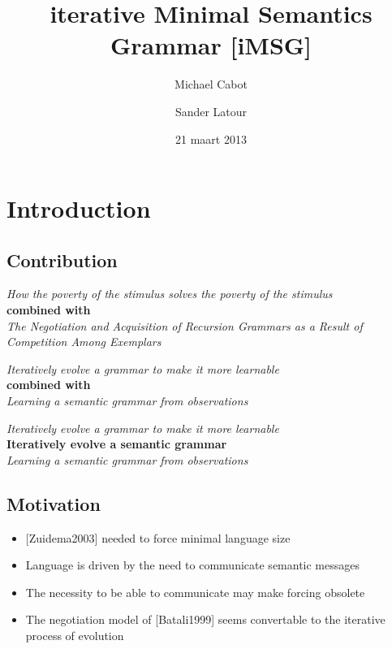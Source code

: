 \documentclass[11pt,a4paper,xcolor=dvipsnames]{beamer}
\author[Michael Cabot \and Sander Latour]{Michael Cabot \and Sander Latour}
\institute{University of Amsterdam}
\title[iMSG]{iterative Minimal Semantics Grammar [iMSG]}
\date{21 maart 2013}
\begin{document}
\begin{frame}
\titlepage
\end{frame}

\begin{frame}
\tableofcontents
\end{frame}

\section{Introduction}
\subsection{Contribution}
\begin{frame}
  \begin{center}
    \textit{How the poverty of the stimulus solves the poverty of the stimulus}\\
    \vfill
    \textbf{combined with}\\
    \vfill
    \textit{The Negotiation and Acquisition of Recursion Grammars as a Result of Competition Among Exemplars}
  \end{center}
\end{frame}

\begin{frame}
  \begin{center}
    \textit{Iteratively evolve a grammar to make it more learnable}\\
    \vfill
    \textbf{combined with}\\
    \vfill
    \textit{Learning a semantic grammar from observations}
  \end{center}
\end{frame}

\begin{frame}
  \begin{center}
    \textit{Iteratively evolve a grammar to make it more learnable}\\
    \vfill
    \textbf{Iteratively evolve a semantic grammar}\\
    \vfill
    \textit{Learning a semantic grammar from observations}
  \end{center}
\end{frame}

\subsection{Motivation}
\begin{frame}
  \begin{itemize}
    \item \hspace*{0pt}[Zuidema2003] needed to force minimal language size
    \item Language is driven by the need to communicate semantic messages
    \item The necessity to be able to communicate may make forcing obsolete
    \item The negotiation model of [Batali1999] seems convertable to the iterative process of evolution
  \end{itemize}
\end{frame}
\end{document}
